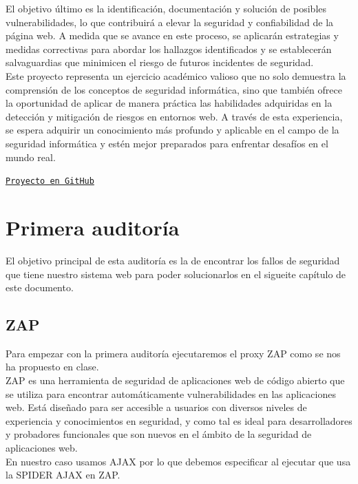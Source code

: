 \documentclass{report}
\begin{document}
        El objetivo último es la identificación, documentación y solución de posibles vulnerabilidades, lo que contribuirá a elevar la seguridad y confiabilidad de la página web. A medida que se avance en este proceso, se aplicarán estrategias y medidas correctivas para abordar los hallazgos identificados y se establecerán salvaguardias que minimicen el riesgo de futuros incidentes de seguridad.\\
        
        Este proyecto representa un ejercicio académico valioso que no solo demuestra la comprensión de los conceptos de seguridad informática, sino que también ofrece la oportunidad de aplicar de manera práctica las habilidades adquiridas en la detección y mitigación de riesgos en entornos web. A través de esta experiencia, se espera adquirir un conocimiento más profundo y aplicable en el campo de la seguridad informática y estén mejor preparados para enfrentar desafíos en el mundo real.\\

        \begin{center}
            \texttt{\large\href{https://github.com/Xabierland/SGSSI-Proyecto}{Proyecto en GitHub}}
        \end{center}
    \chapter{Primera auditoría}
        El objetivo principal de esta auditoría es la de encontrar los fallos de seguridad que tiene nuestro sistema web para poder solucionarlos en el sigueite capítulo de este documento.
        \section{ZAP}
            Para empezar con la primera auditoría ejecutaremos el proxy ZAP como se nos ha propuesto en clase.\\
            
            ZAP es una herramienta de seguridad de aplicaciones web de código abierto que se utiliza para encontrar automáticamente vulnerabilidades en las aplicaciones web. Está diseñado para ser accesible a usuarios con diversos niveles de experiencia y conocimientos en seguridad, y como tal es ideal para desarrolladores y probadores funcionales que son nuevos en el ámbito de la seguridad de aplicaciones web.\\
            
            En nuestro caso usamos AJAX por lo que debemos especificar al ejecutar que usa la SPIDER AJAX en ZAP.\\
            
\end{document}
